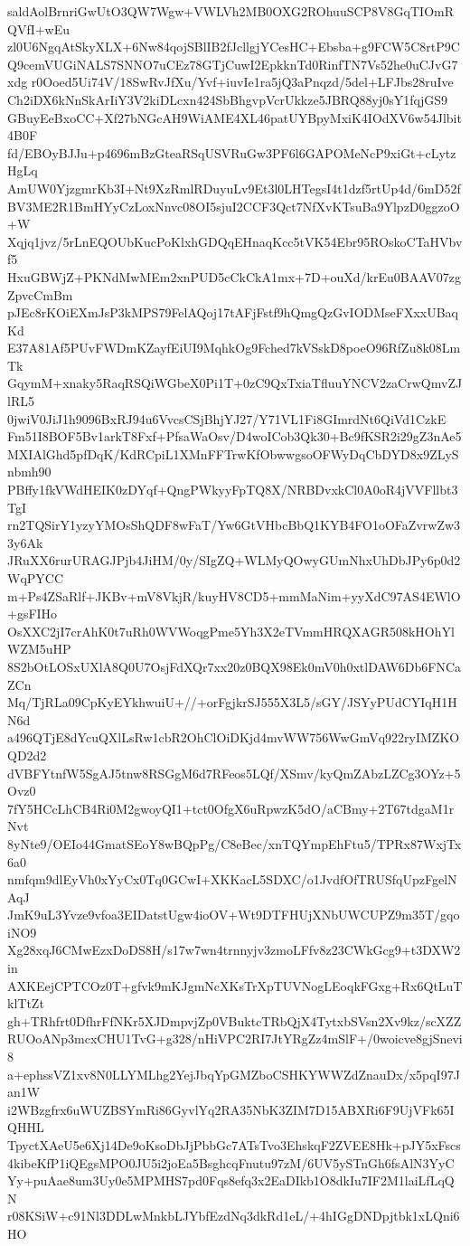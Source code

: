 saldAolBrnriGwUtO3QW7Wgw+VWLVh2MB0OXG2ROhuuSCP8V8GqTIOmRQVfI+wEu
zl0U6NgqAtSkyXLX+6Nw84qojSBlIB2fJcllgjYCesHC+Ebsba+g9FCW5C8rtP9C
Q9cemVUGiNALS7SNNO7uCEz78GTjCuwI2EpkknTd0RinfTN7Vs52he0uCJvG7xdg
r0Ooed5Ui74V/18SwRvJfXu/Yvf+iuvIe1ra5jQ3aPnqzd/5del+LFJbs28ruIve
Ch2iDX6kNnSkArIiY3V2kiDLcxn424SbBhgvpVcrUkkze5JBRQ88yj0sY1fqjGS9
GBuyEeBxoCC+Xf27bNGcAH9WiAME4XL46patUYBpyMxiK4IOdXV6w54Jlbit4B0F
fd/EBOyBJJu+p4696mBzGteaRSqUSVRuGw3PF6l6GAPOMeNcP9xiGt+cLytzHgLq
AmUW0YjzgmrKb3I+Nt9XzRmlRDuyuLv9Et3l0LHTegsI4t1dzf5rtUp4d/6mD52f
BV3ME2R1BmHYyCzLoxNnvc08OI5sjuI2CCF3Qct7NfXvKTsuBa9YlpzD0ggzoO+W
Xqjq1jvz/5rLnEQOUbKucPoKlxhGDQqEHnaqKcc5tVK54Ebr95ROskoCTaHVbvf5
HxuGBWjZ+PKNdMwMEm2xnPUD5cCkCkA1mx+7D+ouXd/krEu0BAAV07zgZpvcCmBm
pJEc8rKOiEXmJsP3kMPS79FelAQoj17tAFjFstf9hQmgQzGvIODMseFXxxUBaqKd
E37A81Af5PUvFWDmKZayfEiUI9MqhkOg9Fched7kVSskD8poeO96RfZu8k08LmTk
GqymM+xnaky5RaqRSQiWGbeX0Pi1T+0zC9QxTxiaTfluuYNCV2zaCrwQmvZJlRL5
0jwiV0JiJ1h9096BxRJ94u6VvcsCSjBhjYJ27/Y71VL1Fi8GImrdNt6QiVd1CzkE
Fm51I8BOF5Bv1arkT8Fxf+PfsaWaOsv/D4woICob3Qk30+Bc9fKSR2i29gZ3nAe5
MXIAlGhd5pfDqK/KdRCpiL1XMnFFTrwKfObwwgsoOFWyDqCbDYD8x9ZLySnbmh90
PBffy1fkVWdHEIK0zDYqf+QngPWkyyFpTQ8X/NRBDvxkCl0A0oR4jVVFllbt3TgI
rn2TQSirY1yzyYMOsShQDF8wFaT/Yw6GtVHbcBbQ1KYB4FO1oOFaZvrwZw33y6Ak
JRuXX6rurURAGJPjb4JiHM/0y/SIgZQ+WLMyQOwyGUmNhxUhDbJPy6p0d2WqPYCC
m+Ps4ZSaRlf+JKBv+mV8VkjR/kuyHV8CD5+mmMaNim+yyXdC97AS4EWlO+gsFIHo
OsXXC2jI7crAhK0t7uRh0WVWoqgPme5Yh3X2eTVmmHRQXAGR508kHOhYlWZM5uHP
8S2bOtLOSxUXlA8Q0U7OsjFdXQr7xx20z0BQX98Ek0mV0h0xtlDAW6Db6FNCaZCn
Mq/TjRLa09CpKyEYkhwuiU+//+orFgjkrSJ555X3L5/sGY/JSYyPUdCYIqH1HN6d
a496QTjE8dYcuQXlLsRw1cbR2OhClOiDKjd4mvWW756WwGmVq922ryIMZKOQD2d2
dVBFYtnfW5SgAJ5tnw8RSGgM6d7RFeos5LQf/XSmv/kyQmZAbzLZCg3OYz+5Ovz0
7fY5HCcLhCB4Ri0M2gwoyQI1+tct0OfgX6uRpwzK5dO/aCBmy+2T67tdgaM1rNvt
8yNte9/OEIo44GmatSEoY8wBQpPg/C8eBec/xnTQYmpEhFtu5/TPRx87WxjTx6a0
nmfqm9dlEyVh0xYyCx0Tq0GCwI+XKKacL5SDXC/o1JvdfOfTRUSfqUpzFgelNAqJ
JmK9uL3Yvze9vfoa3EIDatstUgw4ioOV+Wt9DTFHUjXNbUWCUPZ9m35T/gqoiNO9
Xg28xqJ6CMwEzxDoDS8H/s17w7wn4trnnyjv3zmoLFfv8z23CWkGcg9+t3DXW2in
AXKEejCPTCOz0T+gfvk9mKJgmNcXKsTrXpTUVNogLEoqkFGxg+Rx6QtLuTklTtZt
gh+TRhfrt0DfhrFfNKr5XJDmpvjZp0VBuktcTRbQjX4TytxbSVsn2Xv9kz/scXZZ
RUOoANp3mcxCHU1TvG+g328/nHiVPC2RI7JtYRgZz4mSlF+/0woicve8gjSnevi8
a+ephssVZ1xv8N0LLYMLhg2YejJbqYpGMZboCSHKYWWZdZnauDx/x5pqI97Jan1W
i2WBzgfrx6uWUZBSYmRi86GyvlYq2RA35NbK3ZIM7D15ABXRi6F9UjVFk65IQHHL
TpyctXAeU5e6Xj14De9oKsoDbJjPbbGc7ATsTvo3EhskqF2ZVEE8Hk+pJY5xFscs
4kibeKfP1iQEgsMPO0JU5i2joEa5BsghcqFnutu97zM/6UV5ySTnGh6fsAlN3YyC
Yy+puAae8um3Uy0e5MPMHS7pd0Fqs8efq3x2EaDIkb1O8dkIu7IF2M1laiLfLqQN
r08KSiW+c91Nl3DDLwMnkbLJYbfEzdNq3dkRd1eL/+4hIGgDNDpjtbk1xLQni6HO

